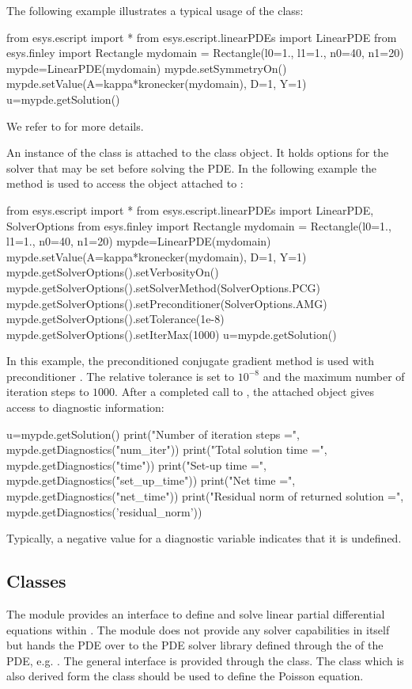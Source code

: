 The following example illustrates a typical usage of the \LinearPDE class:
\begin{python}
  from esys.escript import *
  from esys.escript.linearPDEs import LinearPDE
  from esys.finley import Rectangle
  mydomain = Rectangle(l0=1., l1=1., n0=40, n1=20)
  mypde=LinearPDE(mydomain)
  mypde.setSymmetryOn()
  mypde.setValue(A=kappa*kronecker(mydomain), D=1, Y=1)
  u=mypde.getSolution()
\end{python}
We refer to  for more details.

An instance of the \SolverOptions class is attached to the \LinearPDE class
object. It holds options for the solver that may be set before solving the PDE.
In the following example the  method is used to
access the \SolverOptions object attached to :
\begin{python}
  from esys.escript import *
  from esys.escript.linearPDEs import LinearPDE, SolverOptions
  from esys.finley import Rectangle
  mydomain = Rectangle(l0=1., l1=1., n0=40, n1=20)
  mypde=LinearPDE(mydomain)
  mypde.setValue(A=kappa*kronecker(mydomain), D=1, Y=1)
  mypde.getSolverOptions().setVerbosityOn()
  mypde.getSolverOptions().setSolverMethod(SolverOptions.PCG)
  mypde.getSolverOptions().setPreconditioner(SolverOptions.AMG)
  mypde.getSolverOptions().setTolerance(1e-8)
  mypde.getSolverOptions().setIterMax(1000)
  u=mypde.getSolution()
\end{python}
In this example, the preconditioned conjugate gradient method \PCG is used
with preconditioner \AMG. The relative tolerance is set to $10^{-8}$ and
the maximum number of iteration steps to $1000$.
After a completed call to , the attached \SolverOptions
object gives access to diagnostic information:
\begin{python}
  u=mypde.getSolution()
  print("Number of iteration steps =", mypde.getDiagnostics("num_iter"))
  print("Total solution time =", mypde.getDiagnostics("time"))
  print("Set-up time =", mypde.getDiagnostics("set_up_time"))
  print("Net time =", mypde.getDiagnostics("net_time"))
  print("Residual norm of returned solution =", mypde.getDiagnostics('residual_norm'))
\end{python}
Typically, a negative value for a diagnostic variable indicates that it is
undefined.

\subsection{Classes}
The module \linearPDEs provides an interface to define and solve linear partial
differential equations within \escript. The module \linearPDEs does not
provide any solver capabilities in itself but hands the PDE over to the PDE
solver library defined through the \Domain of the PDE, e.g. \finley.
The general interface is provided through the \LinearPDE class. The \Poisson
class which is also derived form the \LinearPDE class should be used to define
the Poisson equation.

